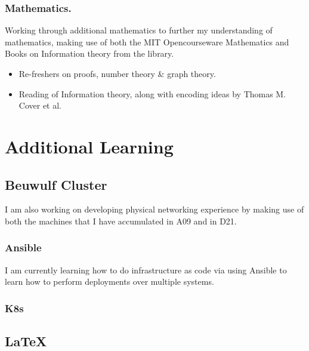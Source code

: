 \documentclass[]{scrreprt}
\begin{document}
\subsection{Mathematics.}
Working through additional mathematics to further my understanding of mathematics, making use of both the MIT Opencourseware Mathematics and Books on Information theory from the library.
\begin{itemize}
  \item Re-freshers on proofs, number theory \& graph theory.
  \item Reading of Information theory, along with encoding ideas by Thomas M. Cover et al.
\end{itemize}



\chapter{Additional Learning}
\section{Beuwulf Cluster}
I am also working on developing physical networking experience by making use of both the machines that I have accumulated in A09 and in D21.
\subsection{Ansible}
I am currently learning how to do infrastructure as code via using Ansible to learn how to perform deployments over multiple systems.
\subsection{K8s}

\section{\LaTeX}
\end{document}
